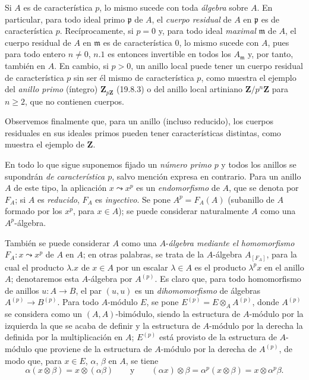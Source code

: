 \begin{env}[21.1.3]
\label{0.21.1.3-fr}
Si $A$ es de característica $p$, lo mismo sucede con toda \emph{álgebra} sobre $A$.
En particular, para todo ideal primo $\mathfrak p$ de $A$, el \emph{cuerpo residual}
de $A$ en $\mathfrak p$ es de característica $p$. Recíprocamente, si $p=0$
y, para todo ideal \emph{maximal} $\mathfrak m$ de $A$, el cuerpo residual de $A$ en
$\mathfrak m$ es de característica $0$, lo mismo sucede con $A$, pues para
todo entero $n\neq0$, $n.1$ es entonces invertible en todos los
$A_{\mathfrak m}$ y, por tanto, también en $A$. En cambio, si $p>0$, un
anillo local puede tener un cuerpo residual de característica $p$ sin ser él
mismo de característica $p$, como muestra el ejemplo del \emph{anillo primo}
(íntegro) $\mathbf Z_{p\mathbf Z}$ (19.8.3) o del anillo local artiniano
$\mathbf Z/p^n\mathbf Z$ para $n\geq2$, que no contienen cuerpos.

Observemos finalmente que, para un anillo (incluso reducido), los cuerpos
residuales en sus ideales primos pueden tener características distintas, como
muestra el ejemplo de $\mathbf Z$.
\end{env}

\begin{env}[21.1.4]
\label{0.21.1.4-fr}
En todo lo que sigue suponemos fijado un \emph{número primo $p$} y todos los anillos
se supondrán \emph{de característica $p$}, salvo mención expresa en contrario. Para
un anillo $A$ de este tipo, la aplicación $x\leadsto x^p$ es un \emph{endomorfismo} de
$A$, que se denota por $F_A$; si $A$ es \emph{reducido}, $F_A$ es \emph{inyectivo}. Se pone
$A^p=F_A(A)$ (subanillo de $A$ formado por los $x^p$, para $x\in A$); se puede
considerar naturalmente $A$ como una $A^p$-álgebra.

También se puede considerar $A$ como una $A$-\emph{álgebra mediante el homomorfismo}
$F_A:x\leadsto x^p$ de $A$ en $A$; en otras palabras, se trata de la $A$-álgebra
$A_{[F_A]}$, para la cual el producto $\lambda.x$ de $x\in A$ por un
escalar $\lambda\in A$ es el producto $\lambda^p x$ en el anillo $A$; denotaremos esta $A$-álgebra por $A^{(p)}$. Es
claro que, para todo homomorfismo de anillos $u:A\to B$, el par $(u,u)$ es un
\emph{dihomomorfismo} de álgebras $A^{(p)}\to B^{(p)}$.
Para todo $A$-módulo $E$, se pone $E^{(p)}=E\otimes_A A^{(p)}$, donde
$A^{(p)}$ se considera como un $(A,A)$-bimódulo, siendo la estructura de
$A$-módulo por la izquierda la que se acaba de definir y la estructura de
$A$-módulo por la derecha la definida por la multiplicación en $A$; $E^{(p)}$ está provisto de la estructura de $A$-módulo que proviene de la estructura de $A$-módulo por la derecha de $A^{(p)}$, de modo que,
para $x\in E$, $\alpha$, $\beta$ en $A$, se tiene
\[
  \alpha(x\otimes\beta)=x\otimes(\alpha\beta)\qquad\text{y}\qquad
  (\alpha x)\otimes\beta=\alpha^p(x\otimes\beta)=x\otimes\alpha^p\beta.
\]
\end{env}

